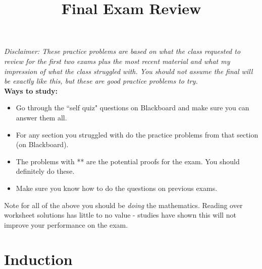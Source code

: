 \documentclass[12pt]{amsart}
\title{ Final Exam Review}
\theoremstyle{definition}
\begin{document}
\maketitle

\noindent\emph{Disclaimer: These practice problems are based on what the class requested to review for the first two exams plus the most recent material and what my impression of what the class struggled with. You should not assume the final will be exactly like this, but these are good practice problems to try.}\\


\noindent\textbf{Ways to study:}
\begin{itemize} 
\item Go through the ``self quiz" questions on Blackboard and make sure you can answer them all. 
\item For any section you struggled with do the practice problems from that section (on Blackboard).
\item The problems with ** are the potential proofs for the exam. You should definitely do these.
\item Make sure you know how to do the questions on previous exams.
\end{itemize}
Note for all of the above you should be \emph{doing} the mathematics. Reading over worksheet solutions has little to no value - studies have shown this will not improve your performance on the exam.
		
%
%
%


\section{Induction}
\end{document}
